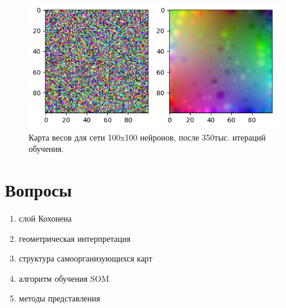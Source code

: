 \documentclass[a4paper,12pt]{article}
\begin{document}
\begin{enumerate}
  \begin{figure}[H]
    \centering
    \includegraphics[width=\textwidth]{habr-100.png}
    \caption{Карта весов для сети 100x100 нейронов, после 350тыс. итераций обучения.}
  \end{figure}
\end{enumerate}

\section{Вопросы}

\begin{enumerate}
  \item слой Кохонена
  \item геометрическая интерпретация
  \item структура самоорганизующихся карт
  \item алгоритм обучения SOM
  \item методы представления
\end{enumerate}
\end{document}
